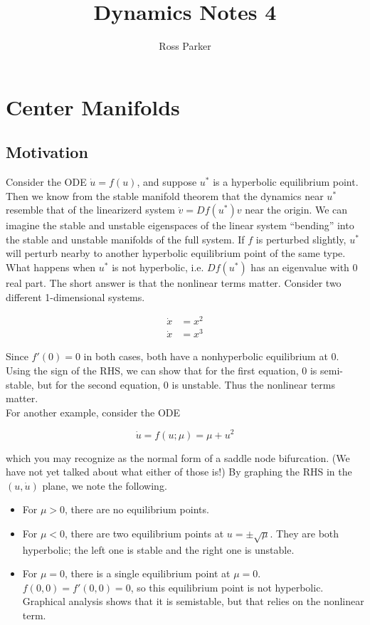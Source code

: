 \documentclass{article}
\title{Dynamics Notes 4}
\author{Ross Parker}
\begin{document}
\section{Center Manifolds}

\subsection{Motivation}

Consider the ODE $\dot{u} = f(u)$, and suppose $u^*$ is a hyperbolic equilibrium point. Then we know from the stable manifold theorem that the dynamics near $u^*$ resemble that of the linearizerd system $\dot{v} = Df(u^*) v$ near the origin. We can imagine the stable and unstable eigenspaces of the linear system ``bending'' into the stable and unstable manifolds of the full system. If $f$ is perturbed slightly, $u^*$ will perturb nearby to another hyperbolic equilibrium point of the same type.
\\

What happens when $u^*$ is not hyperbolic, i.e. $Df(u^*)$ has an eigenvalue with 0 real part. The short answer is that the nonlinear terms matter. Consider two different 1-dimensional systems.

\begin{align}
\dot{x} &= x^2 \\
\dot{x} &= x^3
\end{align}

Since $f'(0) = 0$ in both cases, both have a nonhyperbolic equilibrium at 0. Using the sign of the RHS, we can show that for the first equation, 0 is semi-stable, but for the second equation, 0 is unstable. Thus the nonlinear terms matter.\\

For another example, consider the ODE

\begin{equation}
\dot{u} = f(u; \mu) = \mu + u^2
\end{equation}

which you may recognize as the normal form of a saddle node bifurcation. (We have not yet talked about what either of those is!) By graphing the RHS in the $(u, \dot{u})$ plane, we note the following.

\begin{itemize}
	\item For $\mu > 0$, there are no equilibrium points.
	\item For $\mu < 0$, there are two equilibrium points at $u = \pm \sqrt{\mu}$. They are both hyperbolic; the left one is stable and the right one is unstable.
	\item For $\mu = 0$, there is a single equilibrium point at $\mu = 0$. $f(0, 0) = f'(0, 0) = 0$, so this equilibrium point is not hyperbolic. Graphical analysis shows that it is semistable, but that relies on the nonlinear term.
\end{itemize}
\end{document}
